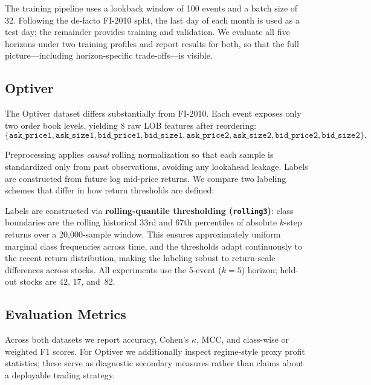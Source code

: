 \documentclass[11pt]{article}
\begin{document}
The training pipeline uses a lookback window of 100 events and a batch size of 32. Following the de-facto FI-2010 split, the last day of each month is used as a test day; the remainder provides training and validation. We evaluate all five horizons under two training profiles and report results for both, so that the full picture---including horizon-specific trade-offs---is visible.

\subsection{Optiver}
The Optiver dataset differs substantially from FI-2010. Each event exposes only two order book levels, yielding 8 raw LOB features after reordering:
\[
\{\texttt{ask\_price1}, \texttt{ask\_size1}, \texttt{bid\_price1}, \texttt{bid\_size1},
\texttt{ask\_price2}, \texttt{ask\_size2}, \texttt{bid\_price2}, \texttt{bid\_size2}\}.
\]

Preprocessing applies \emph{causal} rolling normalization so that each sample is standardized only from past observations, avoiding any lookahead leakage. Labels are constructed from future log mid-price returns. We compare two labeling schemes that differ in how return thresholds are defined:

Labels are constructed via \textbf{rolling-quantile thresholding (\texttt{rolling3})}: class boundaries are the rolling historical 33rd and 67th percentiles of absolute $k$-step returns over a 20{,}000-sample window. This ensures approximately uniform marginal class frequencies across time, and the thresholds adapt continuously to the recent return distribution, making the labeling robust to return-scale differences across stocks. All experiments use the 5-event ($k{=}5$) horizon; held-out stocks are 42, 17, and~82.

\subsection{Evaluation Metrics}
Across both datasets we report accuracy, Cohen's $\kappa$, MCC, and class-wise or weighted F1 scores. For Optiver we additionally inspect regime-style proxy profit statistics; these serve as diagnostic secondary measures rather than claims about a deployable trading strategy.
\end{document}
